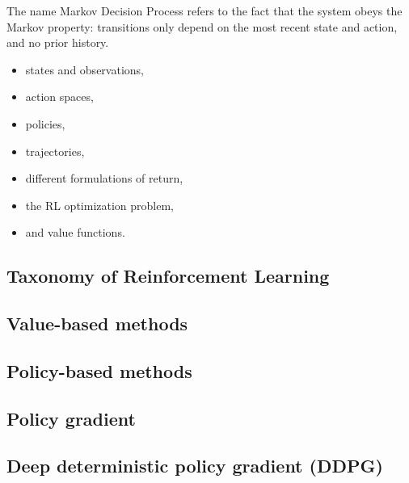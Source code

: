 The name Markov Decision Process refers to the fact that the system obeys the
Markov property: transitions only depend on the most recent state and action,
and no prior history.



\begin{itemize}
    \item states and observations,
    \item action spaces,
    \item policies,
    \item trajectories,
    \item different formulations of return,
    \item the RL optimization problem,
    \item and value functions.
\end{itemize}

\subsection{Taxonomy of Reinforcement Learning}

\subsection{Value-based methods}

\subsection{Policy-based methods}

\subsection{Policy gradient}

\subsection{Deep deterministic policy gradient (DDPG)}
